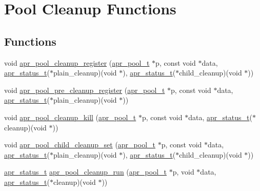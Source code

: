 \hypertarget{group___pool_cleanup}{\section{Pool Cleanup Functions}
\label{group___pool_cleanup}
}
\subsection*{Functions}
\begin{DoxyCompactItemize}
\item 
void \hyperlink{group___pool_cleanup_ga6bdb28224dfe08160cbe3ba6b22dcbd7}{apr\-\_\-pool\-\_\-cleanup\-\_\-register} (\hyperlink{group__apr__pools_gaf137f28edcf9a086cd6bc36c20d7cdfb}{apr\-\_\-pool\-\_\-t} $\ast$p, const void $\ast$data, \hyperlink{group__apr__errno_gaf76ee4543247e9fb3f3546203e590a6c}{apr\-\_\-status\-\_\-t}($\ast$plain\-\_\-cleanup)(void $\ast$), \hyperlink{group__apr__errno_gaf76ee4543247e9fb3f3546203e590a6c}{apr\-\_\-status\-\_\-t}($\ast$child\-\_\-cleanup)(void $\ast$))
\item 
void \hyperlink{group___pool_cleanup_ga64114542989d8872c7fd3c62f2a68678}{apr\-\_\-pool\-\_\-pre\-\_\-cleanup\-\_\-register} (\hyperlink{group__apr__pools_gaf137f28edcf9a086cd6bc36c20d7cdfb}{apr\-\_\-pool\-\_\-t} $\ast$p, const void $\ast$data, \hyperlink{group__apr__errno_gaf76ee4543247e9fb3f3546203e590a6c}{apr\-\_\-status\-\_\-t}($\ast$plain\-\_\-cleanup)(void $\ast$))
\item 
void \hyperlink{group___pool_cleanup_gadc59bf32a0302e34fa0a2663f6e48a44}{apr\-\_\-pool\-\_\-cleanup\-\_\-kill} (\hyperlink{group__apr__pools_gaf137f28edcf9a086cd6bc36c20d7cdfb}{apr\-\_\-pool\-\_\-t} $\ast$p, const void $\ast$data, \hyperlink{group__apr__errno_gaf76ee4543247e9fb3f3546203e590a6c}{apr\-\_\-status\-\_\-t}($\ast$cleanup)(void $\ast$))
\item 
void \hyperlink{group___pool_cleanup_ga7197fa6b43d9c5e99de17e0e900989ea}{apr\-\_\-pool\-\_\-child\-\_\-cleanup\-\_\-set} (\hyperlink{group__apr__pools_gaf137f28edcf9a086cd6bc36c20d7cdfb}{apr\-\_\-pool\-\_\-t} $\ast$p, const void $\ast$data, \hyperlink{group__apr__errno_gaf76ee4543247e9fb3f3546203e590a6c}{apr\-\_\-status\-\_\-t}($\ast$plain\-\_\-cleanup)(void $\ast$), \hyperlink{group__apr__errno_gaf76ee4543247e9fb3f3546203e590a6c}{apr\-\_\-status\-\_\-t}($\ast$child\-\_\-cleanup)(void $\ast$))
\item 
\hyperlink{group__apr__errno_gaf76ee4543247e9fb3f3546203e590a6c}{apr\-\_\-status\-\_\-t} \hyperlink{group___pool_cleanup_gabf3913823af6015895a726ab738eaac5}{apr\-\_\-pool\-\_\-cleanup\-\_\-run} (\hyperlink{group__apr__pools_gaf137f28edcf9a086cd6bc36c20d7cdfb}{apr\-\_\-pool\-\_\-t} $\ast$p, void $\ast$data, \hyperlink{group__apr__errno_gaf76ee4543247e9fb3f3546203e590a6c}{apr\-\_\-status\-\_\-t}($\ast$cleanup)(void $\ast$))

\end{DoxyCompactItemize}
